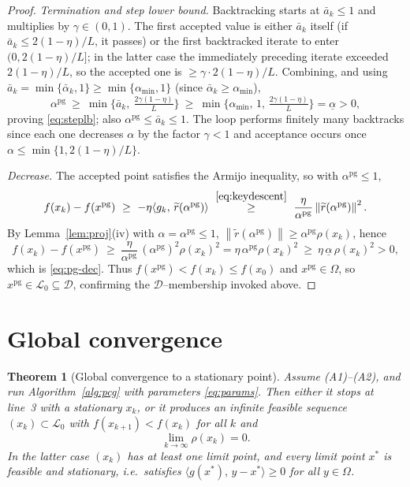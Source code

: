 \documentclass[12pt]{article}
\newtheorem{theorem}{Theorem}
\newcommand{\norm}[1]{\left\lVert #1 \right\rVert}
\newcommand{\inner}[2]{\langle #1,\, #2\rangle}
\begin{document}
\begin{proof}
\emph{Termination and step lower bound.} Backtracking starts at
$\bar a_k\le1$ and multiplies by $\gamma\in(0,1)$. The first accepted value is
either $\bar a_k$ itself (if $\bar a_k\le 2(1-\eta)/L$, it passes) or the first
backtracked iterate to enter $(0,2(1-\eta)/L]$; in the latter case the
immediately preceding iterate exceeded $2(1-\eta)/L$, so the accepted one is
$\ge\gamma\cdot2(1-\eta)/L$. Combining, and using
$\bar a_k=\min\{\bar\alpha_k,1\}\ge\min\{\alpha_{\min},1\}$ (since
$\bar\alpha_k\ge\alpha_{\min}$),
\[
\alpha^{\mathrm{pg}}\ \ge\ \min\Big\{\bar a_k,\ \tfrac{2\gamma(1-\eta)}{L}\Big\}
\ \ge\ \min\Big\{\alpha_{\min},\,1,\,\tfrac{2\gamma(1-\eta)}{L}\Big\}
=\underline\alpha>0,
\]
proving \eqref{eq:steplb}; also $\alpha^{\mathrm{pg}}\le\bar a_k\le1$. The loop
performs finitely many backtracks since each one decreases $\alpha$ by the
factor $\gamma<1$ and acceptance occurs once $\alpha\le\min\{1,2(1-\eta)/L\}$.

\emph{Decrease.} The accepted point satisfies the Armijo inequality, so with
$\alpha^{\mathrm{pg}}\le1$,
\[
f(x_k)-f(x^{\mathrm{pg}})\ \ge\
-\eta\inner{g_k}{\widetilde r(\alpha^{\mathrm{pg}})}
\ \overset{\eqref{eq:keydescent}}{\ge}\
\frac{\eta}{\alpha^{\mathrm{pg}}}\norm{\widetilde r(\alpha^{\mathrm{pg}})}^2 .
\]
By Lemma~\ref{lem:proj}(iv) with $\alpha=\alpha^{\mathrm{pg}}\le1$,
$\norm{\widetilde r(\alpha^{\mathrm{pg}})}\ge\alpha^{\mathrm{pg}}\rho(x_k)$, hence
\[
f(x_k)-f(x^{\mathrm{pg}})\ \ge\
\frac{\eta}{\alpha^{\mathrm{pg}}}\,(\alpha^{\mathrm{pg}})^2\rho(x_k)^2
=\eta\,\alpha^{\mathrm{pg}}\rho(x_k)^2\ \ge\ \eta\,\underline\alpha\,\rho(x_k)^2>0,
\]
which is \eqref{eq:pg-dec}. Thus $f(x^{\mathrm{pg}})<f(x_k)\le f(x_0)$ and
$x^{\mathrm{pg}}\in\Omega$, so $x^{\mathrm{pg}}\in\mathcal L_0\subseteq\mathcal D$,
confirming the $\mathcal D$--membership invoked above.
\end{proof}

\section{Global convergence}

\begin{theorem}[Global convergence to a stationary point]\label{thm:main}
Assume (A1)--(A2), and run Algorithm~\ref{alg:pcg} with
parameters \eqref{eq:params}. Then either it stops at line~3 with a stationary
$x_k$, or it produces an infinite feasible sequence $(x_k)\subset\mathcal L_0$
with $f(x_{k+1})<f(x_k)$ for all $k$ and
\begin{equation}\label{eq:rho0}
\lim_{k\to\infty}\rho(x_k)=0 .
\end{equation}
In the latter case $(x_k)$ has at least one limit point, and \emph{every} limit
point $x^*$ is feasible and stationary, i.e.\ satisfies
$\inner{g(x^*)}{y-x^*}\ge0$ for all $y\in\Omega$.
\end{theorem}
\end{document}

